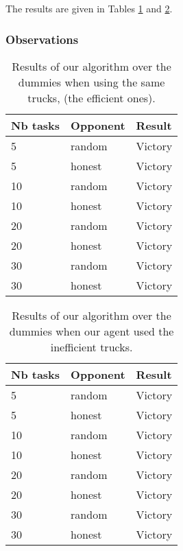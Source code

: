 \documentclass[11pt]{article}
\begin{document}
The results are given in Tables \ref{tab:1} and \ref{tab:2}.

\subsubsection{Observations}
\begin{table}
  \begin{center}
    \begin{tabular}{ | l | l | l | }
    \hline
    Nb tasks & Opponent & Result   \\ \hline
    5 & random & Victory \\ \hline
    5 & honest & Victory \\ \hline
    10 & random & Victory \\ \hline
    10 & honest & Victory \\ \hline
    20 & random & Victory \\ \hline
    20 & honest & Victory \\ \hline
    30 & random & Victory \\ \hline
    30 & honest & Victory \\ \hline

    
    \end{tabular}
    \caption{Results of our algorithm over the dummies when using the same trucks, (the efficient ones).}
    \label{tab:1}
\end{center}
\end{table}

\begin{table}
  \begin{center}
    \begin{tabular}{ | l | l | l | }
    \hline
    Nb tasks & Opponent & Result   \\ \hline
    5 & random & Victory \\ \hline
    5 & honest & Victory \\ \hline
    10 & random & Victory \\ \hline
    10 & honest & Victory \\ \hline
    20 & random & Victory \\ \hline
    20 & honest & Victory \\ \hline
    30 & random & Victory \\ \hline
    30 & honest & Victory \\ \hline
    
    \end{tabular}
    \caption{Results of our algorithm over the dummies when our agent used the inefficient trucks.}
    \label{tab:2}
\end{center}
\end{table}
\end{document}
